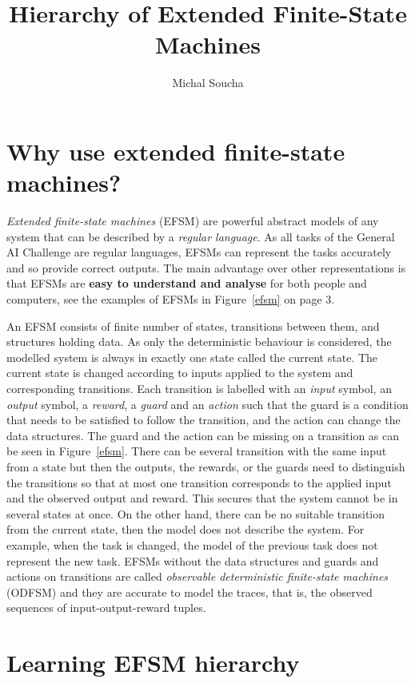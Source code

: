 \documentclass{article} %
\title{Hierarchy of Extended Finite-State Machines}
\author{Michal Soucha}
\begin{document}
\maketitle

\section{Why use extended finite-state machines?}

{\em Extended finite-state machines} (EFSM) are powerful abstract models of any system
that can be described by a {\em regular language}.
As all tasks of the General AI Challenge are regular languages,
EFSMs can represent the tasks accurately and so provide correct outputs.
The main advantage over other representations is that
 EFSMs are {\bf easy to understand and analyse} for both people and computers,
 see the examples of EFSMs in Figure~\ref{efsm} on page 3.

An EFSM consists of finite number of states, transitions between them, and structures holding data.
As only the deterministic behaviour is considered, the modelled system is always in exactly one state
called the current state.
The current state is changed according to inputs applied to the system and corresponding transitions.
Each transition is labelled with an {\em input} symbol, an {\em output} symbol, a {\em reward}, 
a {\em guard} and an {\em action} such that
the guard is a condition that needs to be satisfied to follow the transition,
and the action can change the data structures. 
The guard and the action can be missing on a transition as can be seen in Figure~\ref{efsm}.
There can be several transition with the same input from a state but
then the outputs, the rewards, or the guards need to distinguish the transitions
so that at most one transition corresponds to the applied input and the observed output and reward.
This secures that the system cannot be in several states at once.
On the other hand, there can be no suitable transition from the current state,
then the model does not describe the system. 
For example, when the task is changed, the model of the previous task does not represent the new task.
EFSMs without the data structures and guards and actions on transitions are called
{\em observable deterministic finite-state machines} (ODFSM) and they are accurate
to model the traces, that is, the observed sequences of input-output-reward tuples.

\section{Learning EFSM hierarchy}
\end{document}
